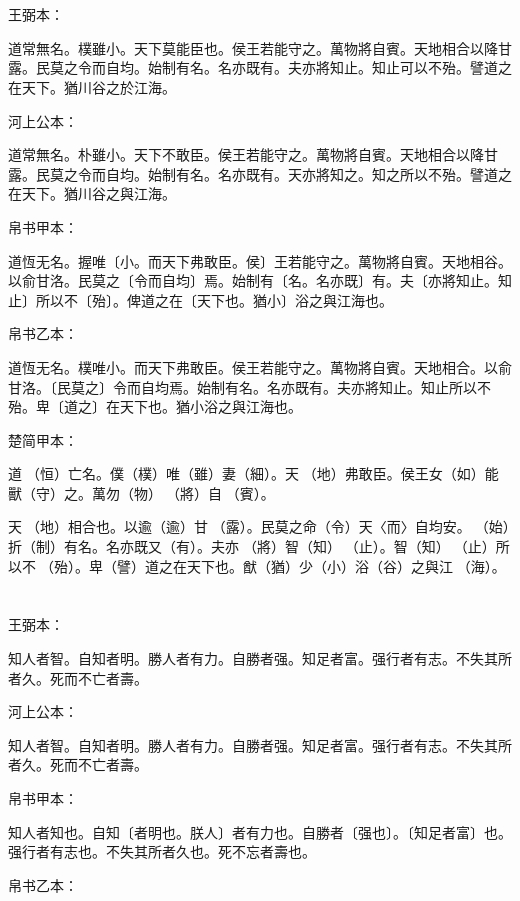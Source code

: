 \documentclass[a5paper]{ctexbook}
\begin{document}
    \chapter{}
    王弼本：

    道常無名。樸雖小。天下莫能臣也。侯王若能守之。萬物將自賓。天地相合以降甘露。民莫之令而自均。始制有名。名亦既有。夫亦將知止。知止可以不殆。譬道之在天下。猶川谷之於江海。

    河上公本：

    道常無名。朴雖小。天下不敢臣。侯王若能守之。萬物將自賓。天地相合以降甘露。民莫之令而自均。始制有名。名亦既有。天亦將知之。知之所以不殆。譬道之在天下。猶川谷之與江海。

    帛书甲本：

    道恆无名。握唯〔小。而天下弗敢臣。侯〕王若能守之。萬物將自賓。天地相谷。以俞甘洛。民莫之〔令而自均〕焉。始制有〔名。名亦既〕有。夫〔亦將知止。知止〕所以不〔殆〕。俾道之在〔天下也。猶小〕浴之與江海也。

    帛书乙本：

    道恆无名。樸唯小。而天下弗敢臣。侯王若能守之。萬物將自賓。天地相合。以俞甘洛。〔民莫之〕令而自均焉。始制有名。名亦既有。夫亦將知止。知止所以不殆。卑〔道之〕在天下也。猶小浴之與江海也。

    楚简甲本：

    道𠄨（恒）亡名。僕（樸）唯（雖）妻（細）。天󶴵（地）弗敢臣。侯王女（如）能獸（守）之。萬勿（物）𨟻（將）自󵦐（賓）。

    天󶴵（地）相合也。以逾（逾）甘𩂣（露）。民莫之命（令）天〈而〉自均安。󶴪（始）折（制）有名。名亦既又（有）。夫亦𨟻（將）智（知）𣥕（止）。智（知）𣥕（止）所以不󶴪（殆）。卑（譬）道之在天下也。猷（猶）少（小）浴（谷）之與江𣳠（海）。

    \chapter{}
    王弼本：

    知人者智。自知者明。勝人者有力。自勝者强。知足者富。强行者有志。不失其所者久。死而不亡者壽。

    河上公本：

    知人者智。自知者明。勝人者有力。自勝者强。知足者富。强行者有志。不失其所者久。死而不亡者壽。

    帛书甲本：

    知人者知也。自知〔者明也。朕人〕者有力也。自勝者〔强也〕。〔知足者富〕也。强行者有志也。不失其所者久也。死不忘者壽也。

    帛书乙本：
\end{document}
